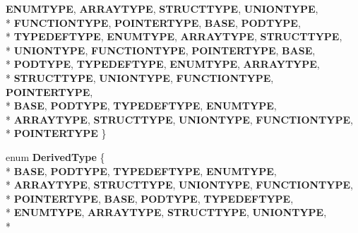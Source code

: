 \begin{DoxyCompactItemize}
{\bfseries E\-N\-U\-M\-T\-Y\-P\-E}, 
{\bfseries A\-R\-R\-A\-Y\-T\-Y\-P\-E}, 
{\bfseries S\-T\-R\-U\-C\-T\-T\-Y\-P\-E}, 
{\bfseries U\-N\-I\-O\-N\-T\-Y\-P\-E}, 
\\*
{\bfseries F\-U\-N\-C\-T\-I\-O\-N\-T\-Y\-P\-E}, 
{\bfseries P\-O\-I\-N\-T\-E\-R\-T\-Y\-P\-E}, 
{\bfseries B\-A\-S\-E}, 
{\bfseries P\-O\-D\-T\-Y\-P\-E}, 
\\*
{\bfseries T\-Y\-P\-E\-D\-E\-F\-T\-Y\-P\-E}, 
{\bfseries E\-N\-U\-M\-T\-Y\-P\-E}, 
{\bfseries A\-R\-R\-A\-Y\-T\-Y\-P\-E}, 
{\bfseries S\-T\-R\-U\-C\-T\-T\-Y\-P\-E}, 
\\*
{\bfseries U\-N\-I\-O\-N\-T\-Y\-P\-E}, 
{\bfseries F\-U\-N\-C\-T\-I\-O\-N\-T\-Y\-P\-E}, 
{\bfseries P\-O\-I\-N\-T\-E\-R\-T\-Y\-P\-E}, 
{\bfseries B\-A\-S\-E}, 
\\*
{\bfseries P\-O\-D\-T\-Y\-P\-E}, 
{\bfseries T\-Y\-P\-E\-D\-E\-F\-T\-Y\-P\-E}, 
{\bfseries E\-N\-U\-M\-T\-Y\-P\-E}, 
{\bfseries A\-R\-R\-A\-Y\-T\-Y\-P\-E}, 
\\*
{\bfseries S\-T\-R\-U\-C\-T\-T\-Y\-P\-E}, 
{\bfseries U\-N\-I\-O\-N\-T\-Y\-P\-E}, 
{\bfseries F\-U\-N\-C\-T\-I\-O\-N\-T\-Y\-P\-E}, 
{\bfseries P\-O\-I\-N\-T\-E\-R\-T\-Y\-P\-E}, 
\\*
{\bfseries B\-A\-S\-E}, 
{\bfseries P\-O\-D\-T\-Y\-P\-E}, 
{\bfseries T\-Y\-P\-E\-D\-E\-F\-T\-Y\-P\-E}, 
{\bfseries E\-N\-U\-M\-T\-Y\-P\-E}, 
\\*
{\bfseries A\-R\-R\-A\-Y\-T\-Y\-P\-E}, 
{\bfseries S\-T\-R\-U\-C\-T\-T\-Y\-P\-E}, 
{\bfseries U\-N\-I\-O\-N\-T\-Y\-P\-E}, 
{\bfseries F\-U\-N\-C\-T\-I\-O\-N\-T\-Y\-P\-E}, 
\\*
{\bfseries P\-O\-I\-N\-T\-E\-R\-T\-Y\-P\-E}
 \}
\item 
enum {\bfseries Derived\-Type} \{ \\*
{\bfseries B\-A\-S\-E}, 
{\bfseries P\-O\-D\-T\-Y\-P\-E}, 
{\bfseries T\-Y\-P\-E\-D\-E\-F\-T\-Y\-P\-E}, 
{\bfseries E\-N\-U\-M\-T\-Y\-P\-E}, 
\\*
{\bfseries A\-R\-R\-A\-Y\-T\-Y\-P\-E}, 
{\bfseries S\-T\-R\-U\-C\-T\-T\-Y\-P\-E}, 
{\bfseries U\-N\-I\-O\-N\-T\-Y\-P\-E}, 
{\bfseries F\-U\-N\-C\-T\-I\-O\-N\-T\-Y\-P\-E}, 
\\*
{\bfseries P\-O\-I\-N\-T\-E\-R\-T\-Y\-P\-E}, 
{\bfseries B\-A\-S\-E}, 
{\bfseries P\-O\-D\-T\-Y\-P\-E}, 
{\bfseries T\-Y\-P\-E\-D\-E\-F\-T\-Y\-P\-E}, 
\\*
{\bfseries E\-N\-U\-M\-T\-Y\-P\-E}, 
{\bfseries A\-R\-R\-A\-Y\-T\-Y\-P\-E}, 
{\bfseries S\-T\-R\-U\-C\-T\-T\-Y\-P\-E}, 
{\bfseries U\-N\-I\-O\-N\-T\-Y\-P\-E}, 
\\*

\end{DoxyCompactItemize}
